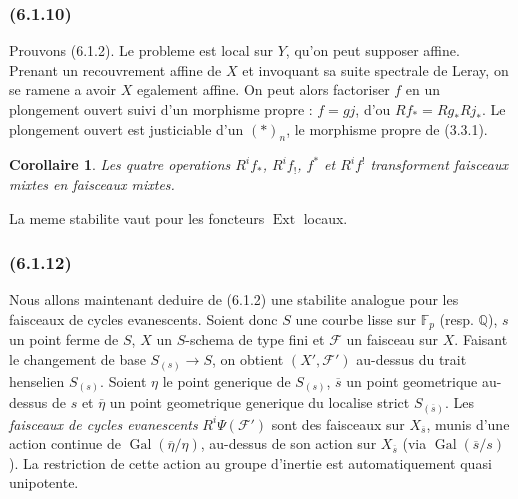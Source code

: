 \documentclass[12pt,a4paper]{article}
\theoremstyle{plain}
\newtheorem{corollary}[theorem]{Corollaire}
\theoremstyle{definition}
\theoremstyle{remark}
\DeclareMathOperator{\Ext}{Ext}
\DeclareMathOperator{\Gal}{Gal}
\newcommand{\bbQ}{\mathbb{Q}}
\newcommand{\scrF}{\mathscr{F}}
\newcommand{\Fp}{\mathbb{F}_p}
\begin{document}
\subsubsection*{\textup{(6.1.10)}}

Prouvons (6.1.2). Le probleme est local sur $Y$, qu'on peut supposer affine. Prenant un recouvrement affine de $X$ et invoquant sa suite spectrale de Leray, on se ramene a avoir $X$ egalement affine. On peut alors factoriser $f$ en un plongement ouvert suivi d'un morphisme propre : $f = gj$, d'ou $Rf_* = Rg_* Rj_*$. Le plongement ouvert est justiciable d'un $(*)_n$, le morphisme propre de (3.3.1).

\begin{corollary}
Les quatre operations $R^i f_*$, $R^i f_!$, $f^*$ et $R^i f^!$ transforment faisceaux mixtes en faisceaux mixtes.
\end{corollary}

La meme stabilite vaut pour les foncteurs $\Ext$ locaux.

\subsubsection*{\textup{(6.1.12)}}

Nous allons maintenant deduire de (6.1.2) une stabilite analogue pour les faisceaux de cycles evanescents. Soient donc $S$ une courbe lisse sur $\Fp$ (resp. $\bbQ$), $s$ un point ferme de $S$, $X$ un $S$-schema de type fini et $\scrF$ un faisceau sur $X$. Faisant le changement de base $S_{(s)} \to S$, on obtient $(X', \scrF')$ au-dessus du trait henselien $S_{(s)}$. Soient $\eta$ le point generique de $S_{(s)}$, $\overline{s}$ un point geometrique au-dessus de $s$ et $\overline{\eta}$ un point geometrique generique du localise strict $S_{(\overline{s})}$. Les \emph{faisceaux de cycles evanescents} $R^i \Psi(\scrF')$ sont des faisceaux sur $X_{\overline{s}}$, munis d'une action continue de $\Gal(\overline{\eta}/\eta)$, au-dessus de son action sur $X_{\overline{s}}$ (via $\Gal(\overline{s}/s)$). La restriction de cette action au groupe d'inertie est automatiquement quasi unipotente.
\end{document}
